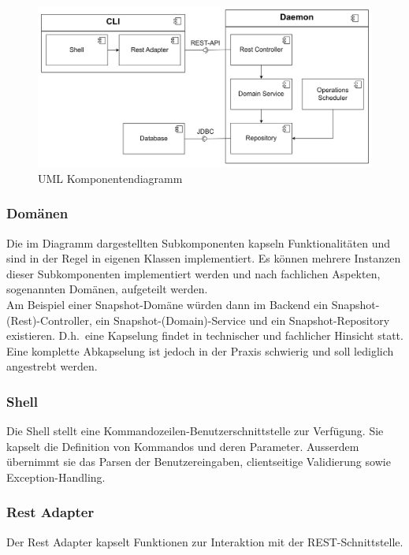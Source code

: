 \documentclass[a4paper,12pt]{report}
\begin{document}
    \begin{figure}[h]
        \centering
        \includegraphics[width=1\textwidth]{assets/comp-diag-tracesentry-v3}
        \caption{UML Komponentendiagramm}
        \label{fig:comp-diag}
        \vspace{2em}
    \end{figure}

    \subsubsection{Domänen}\label{subsubsec:domaenen}
    Die im Diagramm dargestellten Subkomponenten kapseln Funktionalitäten und sind in der Regel in eigenen Klassen implementiert.
    Es können mehrere Instanzen dieser Subkomponenten implementiert werden und nach fachlichen Aspekten, sogenannten Domänen, aufgeteilt werden.
    \\Am Beispiel einer Snapshot-Domäne würden dann im Backend ein Snapshot-(Rest)-Controller, ein Snapshot-(Domain)-Service und ein Snapshot-Repository existieren.
    D.h.\ eine Kapselung findet in technischer und fachlicher Hinsicht statt.
    Eine komplette Abkapselung ist jedoch in der Praxis schwierig und soll lediglich angestrebt werden.\\

    \newpage

    \subsubsection{Shell}\label{subsubsec:shell}
    Die Shell stellt eine Kommandozeilen-Benutzerschnittstelle zur Verfügung.
    Sie kapselt die Definition von Kommandos und deren Parameter.
    Ausserdem übernimmt sie das Parsen der Benutzereingaben, clientseitige Validierung sowie Exception-Handling.

    \subsubsection{Rest Adapter}\label{subsubsec:rest-adapter}
    Der Rest Adapter kapselt Funktionen zur Interaktion mit der REST-Schnittstelle.
\end{document}

